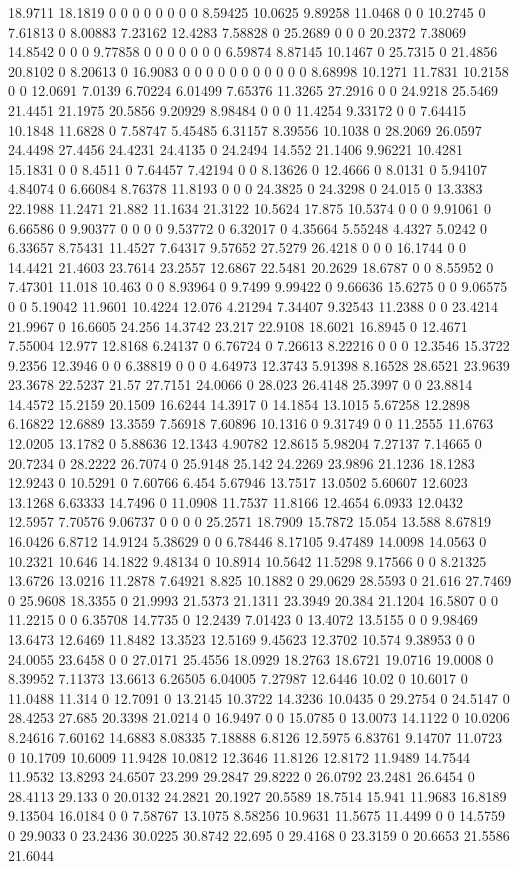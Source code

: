 18.9711 18.1819 0 0 0 0 0 0 0 0 8.59425 10.0625 9.89258 11.0468 0 0 10.2745 0 7.61813 0 8.00883 7.23162 12.4283 7.58828 0 25.2689 0 0 0 20.2372 7.38069 14.8542 0 0 0 9.77858 0 0 0 0 0 0 0 6.59874 8.87145 10.1467 0 25.7315 0 21.4856 20.8102 0 8.20613 0 16.9083 0 0 0 0 0 0 0 0 0 0 0 8.68998 10.1271 11.7831 10.2158 0 0 12.0691 7.0139 6.70224 6.01499 7.65376 11.3265 27.2916 0 0 24.9218 25.5469 21.4451 21.1975 20.5856 9.20929 8.98484 0 0 0 11.4254 9.33172 0 0 7.64415 10.1848 11.6828 0 7.58747 5.45485 6.31157 8.39556 10.1038 0 28.2069 26.0597 24.4498 27.4456 24.4231 24.4135 0 24.2494 14.552 21.1406 9.96221 10.4281 15.1831 0 0 8.4511 0 7.64457 7.42194 0 0 8.13626 0 12.4666 0 8.0131 0 5.94107 4.84074 0 6.66084 8.76378 11.8193 0 0 0 24.3825 0 24.3298 0 24.015 0 13.3383 22.1988 11.2471 21.882 11.1634 21.3122 10.5624 17.875 10.5374 0 0 0 9.91061 0 6.66586 0 9.90377 0 0 0 0 9.53772 0 6.32017 0 4.35664 5.55248 4.4327 5.0242 0 6.33657 8.75431 11.4527 7.64317 9.57652 27.5279 26.4218 0 0 0 16.1744 0 0 14.4421 21.4603 23.7614 23.2557 12.6867 22.5481 20.2629 18.6787 0 0 8.55952 0 7.47301 11.018 10.463 0 0 8.93964 0 9.7499 9.99422 0 9.66636 15.6275 0 0 9.06575 0 0 5.19042 11.9601 10.4224 12.076 4.21294 7.34407 9.32543 11.2388 0 0 23.4214 21.9967 0 16.6605 24.256 14.3742 23.217 22.9108 18.6021 16.8945 0 12.4671 7.55004 12.977 12.8168 6.24137 0 6.76724 0 7.26613 8.22216 0 0 0 12.3546 15.3722 9.2356 12.3946 0 0 6.38819 0 0 0 4.64973 12.3743 5.91398 8.16528 28.6521 23.9639 23.3678 22.5237 21.57 27.7151 24.0066 0 28.023 26.4148 25.3997 0 0 23.8814 14.4572 15.2159 20.1509 16.6244 14.3917 0 14.1854 13.1015 5.67258 12.2898 6.16822 12.6889 13.3559 7.56918 7.60896 10.1316 0 9.31749 0 0 11.2555 11.6763 12.0205 13.1782 0 5.88636 12.1343 4.90782 12.8615 5.98204 7.27137 7.14665 0 20.7234 0 28.2222 26.7074 0 25.9148 25.142 24.2269 23.9896 21.1236 18.1283 12.9243 0 10.5291 0 7.60766 6.454 5.67946 13.7517 13.0502 5.60607 12.6023 13.1268 6.63333 14.7496 0 11.0908 11.7537 11.8166 12.4654 6.0933 12.0432 12.5957 7.70576 9.06737 0 0 0 0 25.2571 18.7909 15.7872 15.054 13.588 8.67819 16.0426 6.8712 14.9124 5.38629 0 0 6.78446 8.17105 9.47489 14.0098 14.0563 0 10.2321 10.646 14.1822 9.48134 0 10.8914 10.5642 11.5298 9.17566 0 0 8.21325 13.6726 13.0216 11.2878 7.64921 8.825 10.1882 0 29.0629 28.5593 0 21.616 27.7469 0 25.9608 18.3355 0 21.9993 21.5373 21.1311 23.3949 20.384 21.1204 16.5807 0 0 11.2215 0 0 6.35708 14.7735 0 12.2439 7.01423 0 13.4072 13.5155 0 0 9.98469 13.6473 12.6469 11.8482 13.3523 12.5169 9.45623 12.3702 10.574 9.38953 0 0 24.0055 23.6458 0 0 27.0171 25.4556 18.0929 18.2763 18.6721 19.0716 19.0008 0 8.39952 7.11373 13.6613 6.26505 6.04005 7.27987 12.6446 10.02 0 10.6017 0 11.0488 11.314 0 12.7091 0 13.2145 10.3722 14.3236 10.0435 0 29.2754 0 24.5147 0 28.4253 27.685 20.3398 21.0214 0 16.9497 0 0 15.0785 0 13.0073 14.1122 0 10.0206 8.24616 7.60162 14.6883 8.08335 7.18888 6.8126 12.5975 6.83761 9.14707 11.0723 0 10.1709 10.6009 11.9428 10.0812 12.3646 11.8126 12.8172 11.9489 14.7544 11.9532 13.8293 24.6507 23.299 29.2847 29.8222 0 26.0792 23.2481 26.6454 0 28.4113 29.133 0 20.0132 24.2821 20.1927 20.5589 18.7514 15.941 11.9683 16.8189 9.13504 16.0184 0 0 7.58767 13.1075 8.58256 10.9631 11.5675 11.4499 0 0 14.5759 0 29.9033 0 23.2436 30.0225 30.8742 22.695 0 29.4168 0 23.3159 0 20.6653 21.5586 21.6044 